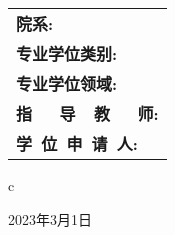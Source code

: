 \begin{center}
	\renewcommand\arraystretch{1.5}
	\begin{tabular}{l}
		{\sihao \bf 院\qquad\qquad 系:} \\
		{\sihao \bf 专业学位类别:}      \\
		{\sihao \bf 专业学位领域:}      \\
		{\sihao \bf 指~~~导~~教~~~师:}      \\
		{\sihao \bf 学~位~申~请~人:}
	\end{tabular}
	\begin{tabular}c
	\end{tabular}
\end{center}

\vskip 2.0cm

\begin{center}
	{\sihao 2023年3月1日}
\end{center}
